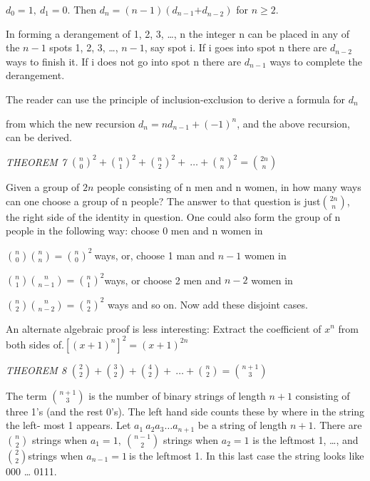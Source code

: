 \(d_{0} = 1,\ d_{1} = 0.\) Then
\(d_{n} = \left( n - 1 \right)(d_{n - 1}{+ d}_{n - 2})\) for
\(n \geq 2\).

In forming a derangement of 1, 2, 3, \ldots{}, n the integer n can be
placed in any of the \(n - 1\) spots 1, 2, 3, \ldots{}, \(n - 1\), say
spot i. If i goes into spot n there are \(d_{n - 2}\) ways to finish it.
If i does not go into spot n there are \(d_{n - 1}\) ways to complete
the derangement.

The reader can use the principle of inclusion-exclusion to derive a
formula for \(d_{n}\)

from which the new recursion
\(d_{n} = nd_{n - 1} + \left( - 1 \right)^{n}\), and the above
recursion, can be derived.

\emph{THEOREM 7} \(\binom{n}{0}
^{2} +
\binom{n}{1}
^{2} +
\binom{n}{2}
^{2} + \ \ldots +
\binom{n}{n}
^{2} =
\binom{2n}{n}
\)

Given a group of \(2n\) people consisting of n men and n women, in how
many ways can one choose a group of n people? The answer to that
question is just\(\binom{2n}{n}
\), the right side of the identity in question. One could
also form the group of n people in the following way: choose 0 men and n
women in

\(\binom{n}{0}
\binom{n}{n}
 =
\binom{n}{0}
^{2}\ \)ways, or, choose 1 man and \(n - 1\) women in

\(\binom{n}{1}
\binom{n}{n - 1}
 =
\binom{n}{1}
^{2}\)ways, or choose 2 men and \(n - 2\) women in

\(\binom{n}{2}
\binom{n}{n - 2}
 =
\binom{n}{2}
^{2}\) ways and so on. Now add these disjoint cases.

An alternate algebraic proof is less interesting: Extract the
coefficient of \(x^{n}\) from both sides
of.\(\left\lbrack \left( x + 1 \right)^{n} \right\rbrack^{2} = \left( x + 1 \right)^{2n}\)

\emph{THEOREM 8} \(\binom{2}{2}
 +
\binom{3}{2}
 +
\binom{4}{2}
 + \ \ldots +
\binom{n}{2}
 =
\binom{n + 1}{3}
\)

The term \(\binom{n + 1}{3}
\) is the number of binary strings of length \(n + 1\)
consisting of three 1's (and the rest 0's). The left hand side counts
these by where in the string the left- most 1 appears. Let
\(a_{1}\ a_{2}a_{3}\ldots a_{n + 1}\) be a string of length \(n + 1\).
There are \(\binom{n}{2}
\) strings when \(a_{1} = 1,\
\binom{n - 1}{2}
\) strings when \(a_{2} = 1\) is the leftmost 1, \ldots{},
and \(\binom{2}{2}
\)strings when \(a_{n - 1} = 1\ \)is the leftmost 1. In
this last case the string looks like 000 \ldots{} 0111.

